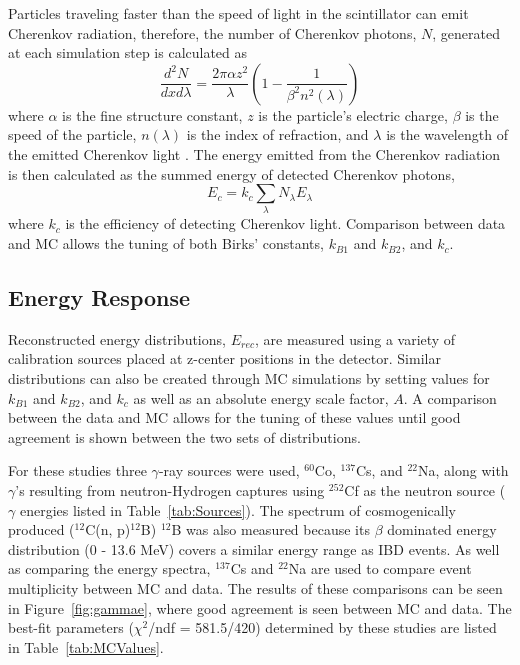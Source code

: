 Particles traveling faster than the speed of light in the scintillator can emit Cherenkov radiation, therefore, the number of Cherenkov photons, $N$, generated at each simulation step is calculated as
\begin{equation}
	\frac{d^2N}{dxd\lambda} = \frac{2\pi \alpha z^2}{\lambda}\left(1-\frac{1}{\beta^2n^2(\lambda)}\right)
\end{equation}
where $\alpha$ is the fine structure constant, $z$ is the particle's electric charge, $\beta$ is the speed of the particle, $n(\lambda)$ is the index of refraction, and $\lambda$ is the wavelength of the emitted Cherenkov light \cite{PDG}.
The energy emitted from the Cherenkov radiation is then calculated as the summed energy of detected Cherenkov photons,
\begin{equation}
	E_c = k_c \sum_{\lambda}N_\lambda E_\lambda
\end{equation}
where $k_c$ is the efficiency of detecting Cherenkov light. 
Comparison between data and MC allows the tuning of both Birks' constants, $k_{B1}$ and $k_{B2}$, and $k_c$.

\subsection{Energy Response}

Reconstructed energy distributions, $E_{rec}$, are measured using a variety of calibration sources placed at z-center positions in the detector. 
Similar distributions can also be created through MC simulations by setting values for $k_{B1}$ and $k_{B2}$, and $k_c$ as well as an absolute energy scale factor, $A$.
A comparison between the data and MC allows for the tuning of these values until good agreement is shown between the two sets of distributions.

For these studies three $\gamma$-ray sources were used, $^{60}$Co, $^{137}$Cs, and $^{22}$Na, along with $\gamma$'s resulting from neutron-Hydrogen captures using $^{252}$Cf as the neutron source ($\gamma$ energies listed in Table~\ref{tab:Sources}).
The spectrum of cosmogenically produced ($^{12}$C(n, p)$^{12}$B) $^{12}$B was also measured because its $\beta$ dominated energy distribution  (0 - 13.6 MeV) covers a similar energy range as IBD events.
As well as comparing the energy spectra, $^{137}$Cs and $^{22}$Na are used to compare event multiplicity between MC and data.
The results of these comparisons can be seen in Figure~\ref{fig:gammae}, where good agreement is seen between MC and data.
The best-fit parameters ($\chi^2$/ndf = 581.5/420) determined by these studies are listed in Table~\ref{tab:MCValues}.

